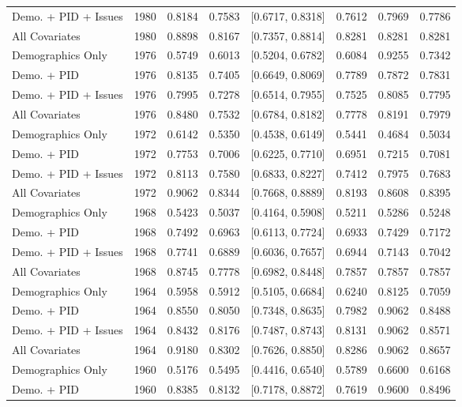 \begin{longtable}{lrrrlrrr}
  Demo. + PID + Issues & 1980 & 0.8184 & 0.7583 & [0.6717, 0.8318] & 0.7612 & 0.7969 & 0.7786 \\ 
  All Covariates & 1980 & 0.8898 & 0.8167 & [0.7357, 0.8814] & 0.8281 & 0.8281 & 0.8281 \\ 
  Demographics Only & 1976 & 0.5749 & 0.6013 & [0.5204, 0.6782] & 0.6084 & 0.9255 & 0.7342 \\ 
  Demo. + PID & 1976 & 0.8135 & 0.7405 & [0.6649, 0.8069] & 0.7789 & 0.7872 & 0.7831 \\ 
  Demo. + PID + Issues & 1976 & 0.7995 & 0.7278 & [0.6514, 0.7955] & 0.7525 & 0.8085 & 0.7795 \\ 
  All Covariates & 1976 & 0.8480 & 0.7532 & [0.6784, 0.8182] & 0.7778 & 0.8191 & 0.7979 \\ 
  Demographics Only & 1972 & 0.6142 & 0.5350 & [0.4538, 0.6149] & 0.5441 & 0.4684 & 0.5034 \\ 
  Demo. + PID & 1972 & 0.7753 & 0.7006 & [0.6225, 0.7710] & 0.6951 & 0.7215 & 0.7081 \\ 
  Demo. + PID + Issues & 1972 & 0.8113 & 0.7580 & [0.6833, 0.8227] & 0.7412 & 0.7975 & 0.7683 \\ 
  All Covariates & 1972 & 0.9062 & 0.8344 & [0.7668, 0.8889] & 0.8193 & 0.8608 & 0.8395 \\ 
  Demographics Only & 1968 & 0.5423 & 0.5037 & [0.4164, 0.5908] & 0.5211 & 0.5286 & 0.5248 \\ 
  Demo. + PID & 1968 & 0.7492 & 0.6963 & [0.6113, 0.7724] & 0.6933 & 0.7429 & 0.7172 \\ 
  Demo. + PID + Issues & 1968 & 0.7741 & 0.6889 & [0.6036, 0.7657] & 0.6944 & 0.7143 & 0.7042 \\ 
  All Covariates & 1968 & 0.8745 & 0.7778 & [0.6982, 0.8448] & 0.7857 & 0.7857 & 0.7857 \\ 
  Demographics Only & 1964 & 0.5958 & 0.5912 & [0.5105, 0.6684] & 0.6240 & 0.8125 & 0.7059 \\ 
  Demo. + PID & 1964 & 0.8550 & 0.8050 & [0.7348, 0.8635] & 0.7982 & 0.9062 & 0.8488 \\ 
  Demo. + PID + Issues & 1964 & 0.8432 & 0.8176 & [0.7487, 0.8743] & 0.8131 & 0.9062 & 0.8571 \\ 
  All Covariates & 1964 & 0.9180 & 0.8302 & [0.7626, 0.8850] & 0.8286 & 0.9062 & 0.8657 \\ 
  Demographics Only & 1960 & 0.5176 & 0.5495 & [0.4416, 0.6540] & 0.5789 & 0.6600 & 0.6168 \\ 
  Demo. + PID & 1960 & 0.8385 & 0.8132 & [0.7178, 0.8872] & 0.7619 & 0.9600 & 0.8496 \\ 

\end{longtable}

